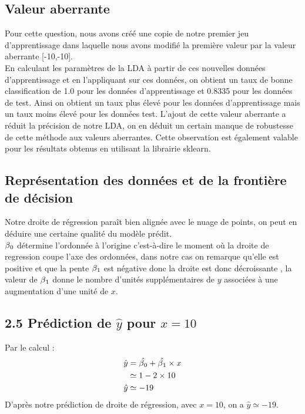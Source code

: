 \documentclass[paper=a4, fontsize=11pt]{scrartcl} %
\numberwithin{equation}{section} %
\numberwithin{figure}{section} %
\numberwithin{table}{section} %
\begin{document}
	\subsection{Valeur aberrante}
		Pour cette question, nous avons créé une copie de notre premier jeu d’apprentissage dans laquelle nous avons modifié la première valeur par la valeur aberrante [-10,-10].\\
		En calculant les paramètres de la LDA à partir de ces nouvelles données  d’apprentissage et en l’appliquant sur ces données, on obtient un taux de bonne classification de 1.0 pour les données d’apprentissage et 0.8335 pour les données de test. 		Ainsi on obtient un taux plus élevé pour les données d’apprentissage mais un taux moins élevé pour les données test. L’ajout de cette valeur aberrante a réduit la précision de notre LDA, on en déduit un certain manque de robustesse de cette 			méthode aux valeurs aberrantes. Cette observation est également valable pour les résultats obtenus en utilisant la librairie sklearn.



	\subsection{Représentation des données et de la frontière de décision}
		\begin{center}
		\end{center}
		Notre droite de régression paraît bien alignée avec le nuage de points, on peut en déduire une certaine qualité du modèle prédit.\\
		$\beta\textsubscript{0}$ détermine l'ordonnée à l'origine c'est-à-dire le moment où la droite de regression coupe l'axe des ordonnées, dans notre cas on remarque qu'elle est positive et que la pente $\beta\textsubscript{1}$ est négative donc la droite est donc décroissante , la valeur de $\beta\textsubscript{1}$ donne le nombre d’unités supplémentaires de $y$ associées à une augmentation d'une unité de $x$.


	\subsection*{2.5 Prédiction de $\hat{y}$ pour $x=10$}
	Par le calcul :
	\begin{align} 
	\begin{split}
	\hat{y}	&= \hat{\beta\textsubscript{0}}+\hat{\beta\textsubscript{1}}\times x\\
	&\simeq1-2\times10\\
	\hat{y}&\simeq-19\\
	\end{split}					
	\end{align}
	D'après notre prédiction de droite de régression, avec $x=10$, on a $\hat{y} \simeq -19$.
\end{document}
